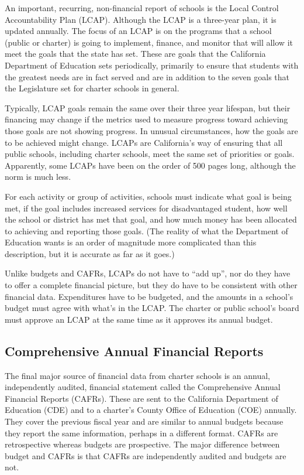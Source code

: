 An important, recurring, non-financial report of schools is the Local Control Accountability Plan (LCAP).
 Although the LCAP is a three-year plan, it is updated annually. The focus of an LCAP is on the programs that a school (public or charter) is going to implement, finance, and monitor that will allow it meet the goals that the state has set. These are goals that the California Department of Education sets periodically, primarily to ensure that students with the greatest needs are in fact served and are in addition to the seven goals that the Legislature set for charter schools in general.

Typically, LCAP goals remain the same over their three year lifespan, but their financing may change if the metrics used to measure progress toward achieving those goals are not showing progress. In unusual circumstances, how the goals are to be achieved might change. LCAPs are California's way of ensuring that all public schools, including charter schools, meet the same set of priorities or goals. Apparently, some LCAPs have been on the order of 500 pages long, although the norm is much less.

For each activity or group of activities, schools must indicate what goal is being met, if the goal includes increased services for disadvantaged student, how well the school or district has met that goal, and how much money has been allocated to achieving and reporting those goals. (The reality of what the Department of Education wants is an order of magnitude more complicated than this description, but it is accurate as far as it goes.)

Unlike budgets and CAFRs, LCAPs do not have to ``add up'', nor do they have to offer a complete financial picture, but they do have to be consistent with other financial data. Expenditures have to be budgeted, and the amounts in a school's budget must agree with what's in the LCAP\@. The charter or public school's board must approve an LCAP at the same time as it approves its annual budget. %

\subsection{Comprehensive Annual Financial Reports}\label{sec:CAFRs}\indent

The final major source of financial data from charter schools is an annual, independently audited, financial statement called the Comprehensive Annual Financial Reports (CAFRs). These are sent to the California Department of Education (CDE) and to a charter's County Office of Education (COE) annually. They cover the previous fiscal year and are similar to annual budgets because they report the same information, perhaps in a different format. CAFRs are retrospective whereas budgets are prospective. The major difference between budget and CAFRs is that CAFRs are independently audited and budgets are not. 

